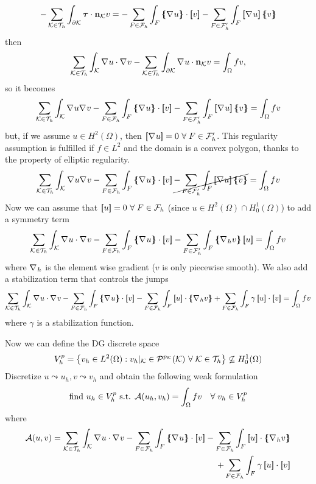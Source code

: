 \[
    -\sum_{\element \in \triangulation} \int_{\partial\element} \bm{\tau} \cdot \vect{n}_{\element} v =- \sum_{F \in \mathcal{F}_h}\int_F\average{\grad u} \cdot \jump{v} - \sum_{F \in \mathcal{F}'_h} \int_{F}\jump{\grad u}\average{v} 
\]
then 
\[
    \sum_{\mathcal{K} \in \mathcal{T}_h} \int_{\mathcal{K}}\nabla\mspace{1mu} u \cdot \nabla\mspace{1mu} v - \sum_{\mathcal{K} \in \mathcal{T}_h} \int_{\partial\mathcal{K}} \nabla\mspace{1mu} u \cdot \textbf{n}_{\mathcal{K}} v = \int_{\Omega} fv,
\]
so it becomes 
\[
    \sum_{\element \in \triangulation} \int_{\element} \grad u \grad v - \sum_{F \in \mathcal{F}_h} \int_{F} \average{\grad u} \cdot \jump{v} - \sum_{F \in \mathcal{F}'_h} \int_F \jump{\grad u} \average{v} = \int_{\Omega} fv
\]
but, if we assume \(u \in H^2(\Omega)\), then \(\left[\mspace{-4mu}\left[\nabla\mspace{1mu} u\right]\mspace{-4mu}\right] = 0 \ \forall \; F \in \mathcal{F}'_h\). This regularity assumption is fulfilled if \(f \in L^2\) and the domain is a convex polygon, thanks to the property of elliptic regularity.
\[
    \sum_{\element \in \triangulation} \int_{\element} \grad u \grad v - \sum_{F \in \mathcal{F}_h} \int_{F} \average{\grad u} \cdot \jump{v} \cancel{- \sum_{F \in \mathcal{F}'_h} \int_F \jump{\grad u} \average{v}} = \int_{\Omega} fv
\]
Now we can assume that \(\left[\mspace{-4mu}\left[u\right]\mspace{-4mu}\right] = 0 \ \forall \; F \in \mathcal{F}_h\) (since \(u \in H^2(\Omega) \cap H^1_0(\Omega)\)) to add a symmetry term 
\[
    \sum_{\element \in \triangulation} \int_\element \grad u \cdot \grad v - \sum_{F \in \mathcal{F}_h} \int_F \average{\grad u} \cdot \jump{v} - \sum_{F \in \mathcal{F}'_h} \int_F \average{\grad_h v} \jump{u} = \int_\Omega fv
\] 
where \(\nabla\mspace{1mu}_h\) is the element wise gradient (\(v\) is only piecewise smooth).
We also add a stabilization term that controls the jumps
\[
    \sum_{\element \in \triangulation} \int_\element \grad u \cdot \grad v  - \sum_{F \in \mathcal{F}_h} \int_F \average{\grad u} \cdot \jump{v} - \sum_{F \in \mathcal{F}_h} \int_F \jump{u} \cdot \average{\grad_h v} + \sum_{F \in \mathcal{F}_h} \int_F \gamma \jump{u} \cdot \jump{v} = \int_\Omega fv
\]
where \(\gamma\) is a stabilization function.

Now we can define the DG discrete space 
\[
    V_h^p = \left\{ v_h \in L^2(\Omega) : v_h\vert_{\mathcal{K}} \in \mathcal{P}^{p_{\mathcal{K}}}(\mathcal{K}) \ \forall \; \mathcal{K} \in \mathcal{T}_h\right\} \not\subseteq H^1_0 (\Omega)
\]
Discretize \(u \leadsto u_h, v \leadsto v_h\) and obtain the following weak formulation
\[
    \text{find } u_h \in V_h^p \text{ s.t. } \mathcal{A}(u_h, v_h) = \int_\Omega fv \quad \forall \;v_h \in V_h^p
\]
where 
\begin{equation*}
    \begin{split}
        \mathcal{A}(u, v) =  \sum_{\element \in \triangulation} \int_\element \grad u \cdot \grad v  - \sum_{F \in \mathcal{F}_h} \int_F \average{\grad u} \cdot \jump{v}  - \sum_{F \in \mathcal{F}_h} \int_F \jump{u} \cdot \average{\grad_h v} \\+ \sum_{F \in \mathcal{F}_h} \int_F \gamma \jump{u} \cdot \jump{v}
    \end{split}
\end{equation*}
